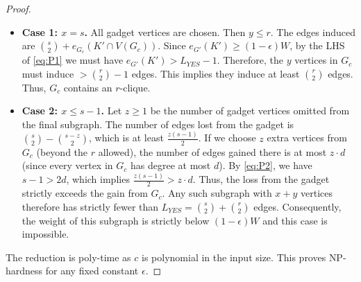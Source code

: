 \begin{proof}
\begin{itemize}
    \item \textbf{Case 1: $x=s$.} All gadget vertices are chosen. Then $y \le r$. The edges induced are $\binom{s}{2} + e_{G_c}(K' \cap V(G_c))$. Since $e_{G'}(K') \ge (1-\epsilon)W$, by the LHS of \eqref{eq:P1} we must have $e_{G'}(K') > L_{YES} - 1$.
    Therefore, the $y$ vertices in $G_c$ must induce $> \binom{r}{2}-1$ edges. This implies they induce at least $\binom{r}{2}$ edges. Thus, $G_c$ contains an $r$-clique.
    
\item \textbf{Case 2: $x \le s-1$.} Let $z \ge 1$ be the number of gadget vertices omitted from the final subgraph. The number of edges lost from the gadget is $\binom{s}{2} - \binom{s-z}{2}$, which is at least $\frac{z(s-1)}{2}$. If we choose $z$ extra vertices from $G_c$ (beyond the $r$ allowed), the number of edges gained there is at most $z \cdot d$ (since every vertex in $G_c$ has degree at most $d$). By \eqref{eq:P2}, we have $s-1 > 2d$, which implies $\frac{z(s-1)}{2} > z \cdot d$. Thus, the loss from the gadget strictly exceeds the gain from $G_c$. Any such subgraph with $x + y$ vertices therefore has strictly fewer than $L_{YES} = \binom{s}{2} + \binom{r}{2}$ edges. Consequently, the weight of this subgraph is strictly below $(1-\epsilon)W$ and this case is impossible.
\end{itemize}

The reduction is poly-time as $c$ is polynomial in the input size. This proves {\sc NP-hardness} for any fixed constant $\epsilon$.
\end{proof}